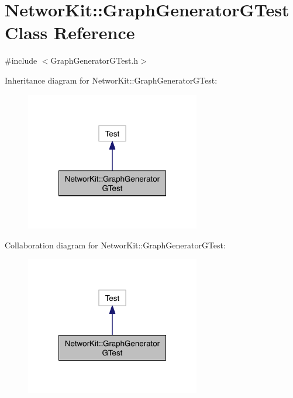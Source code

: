 \hypertarget{class_networ_kit_1_1_graph_generator_g_test}{\section{Networ\-Kit\-:\-:Graph\-Generator\-G\-Test Class Reference}
\label{class_networ_kit_1_1_graph_generator_g_test}
}


{\ttfamily \#include $<$Graph\-Generator\-G\-Test.\-h$>$}



Inheritance diagram for Networ\-Kit\-:\-:Graph\-Generator\-G\-Test\-:\nopagebreak
\begin{figure}[H]
\begin{center}
\leavevmode
\includegraphics[width=216pt]{class_networ_kit_1_1_graph_generator_g_test__inherit__graph}
\end{center}
\end{figure}


Collaboration diagram for Networ\-Kit\-:\-:Graph\-Generator\-G\-Test\-:\nopagebreak
\begin{figure}[H]
\begin{center}
\leavevmode
\includegraphics[width=216pt]{class_networ_kit_1_1_graph_generator_g_test__coll__graph}
\end{center}
\end{figure}
